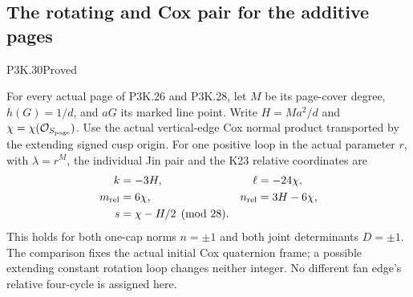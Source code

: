\subsection{The rotating and Cox pair for the additive pages}
\begin{statement}{P3K.30}{Proved}

For every actual page of P3K.26 and P3K.28, let \(M\) be its page-cover degree,
\(h(G)=1/d\), and \(aG\) its marked line point. Write
\(H=Ma^2/d\) and \(\chi=\chi(\mathcal O_{S_{\rm page}})\).
Use the actual vertical-edge Cox normal product transported by the
extending signed cusp origin. For one positive loop in the actual
parameter \(r\), with \(\lambda=r^M\), the individual Jin pair and
the K23 relative coordinates are
\[
 \begin{aligned}
 k&=-3H,&\ell&=-24\chi,\\
 m_{\rm rel}&=6\chi,&n_{\rm rel}&=3H-6\chi,\\
 s&=\chi-H/2\pmod{28}.
 \end{aligned}
\]
This holds for both one-cap norms \(n=\pm1\) and both joint determinants
\(D=\pm1\). The comparison fixes the actual initial Cox quaternion
frame; a possible extending constant rotation loop changes neither
integer. No different fan edge's relative four-cycle is assigned here.

\end{statement}
